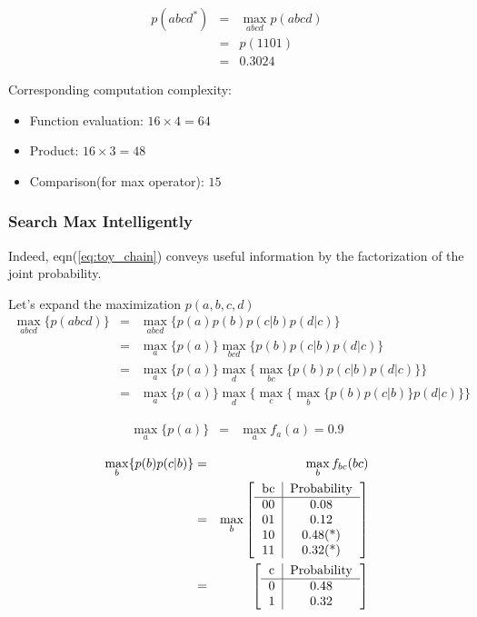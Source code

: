 \documentclass[11pt,a4paper]{article}
\begin{document}
\begin{eqnarray}
	p(abcd^*) &=& \max_{abcd}{p(abcd)} \\
	&=& p(1101) \\ 
	&=& 0.3024 
\end{eqnarray}

Corresponding computation complexity:
\begin{itemize}
	\item Function evaluation: $16 \times 4 = 64$
	\item Product: $16 \times 3 = 48$
	\item Comparison(for max operator): $15$
\end{itemize}

\subsubsection{Search Max Intelligently}
Indeed, eqn(\ref{eq:toy_chain}) conveys useful information by the 
factorization of the joint probability. 

Let's expand the maximization $p(a,b,c,d)$
\begin{eqnarray}
\max_{abcd} \{ p(abcd) \} &=& \max_{abcd} \{ p(a)p(b)p(c|b)p(d|c) \} \\
&=& \max_{a} \{ p(a) \} \max_{bcd} \{ p(b)p(c|b)p(d|c) \}  \\
&=& \max_{a} \{ p(a) \} \max_{d} \{ \max_{bc} \{p(b)p(c|b)p(d|c)\} \}  \\
&=& \max_{a} \{ p(a) \} \max_{d} \{ \max_{c} \{\max_{b} \{p(b)p(c|b) \} p(d|c)\} \}  
\end{eqnarray}

\begin{eqnarray}
\max_{a} \{ p(a) \} &=& \max_{a}{f_a(a)} = 0.9 
\end{eqnarray}

\begin{eqnarray}
\max_{b} \{p(b)p(c|b) \} &=& 
\max_{b} f_{bc}(bc) \\
&=&\max_{b} \left[ 
\begin{tabular}{c|c}
bc & Probability \\
\hline
  00 &   0.08\\
  01 &   0.12\\
  10 &   0.48(*)\\
  11 &   0.32(*)\\
\end{tabular} \right] \\
&=& \left[ 
\begin{tabular}{c|c}
c & Probability \\
\hline
  0 &   0.48\\
  1 &   0.32\\
\end{tabular} \right]
\end{eqnarray}
\end{document}
